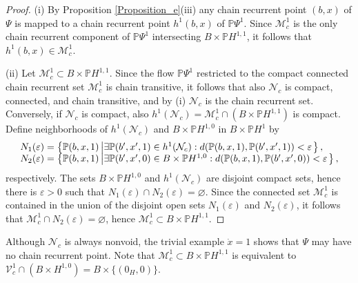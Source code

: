 	\begin{proof}
		(i) By Proposition \ref{Proposition_e}(iii) any chain recurrent point $(b,x)$
		of $\Psi$ is mapped to a chain recurrent point $h^{1}(b,x)$ of $\mathbb{P}%
		\Psi^{1}$. Since $\mathcal{M}_{c}^{1}$ is the only chain recurrent component
		of $\mathbb{P}\Psi^{1}$ intersecting $B\times\mathbb{P}H^{1,1}$, it follows
		that $h^{1}(b,x)\in\mathcal{M}_{c}^{1}$.
		
		(ii) Let $\mathcal{M}_{c}^{1}\subset B\times\mathbb{P}H^{1,1}$. Since the flow
		$\mathbb{P}\Psi^{1}$ restricted to the compact connected chain recurrent set
		$\mathcal{M}_{c}^{1}$ is chain transitive, it follows that also $\mathcal{N}%
		_{c}$ is compact, connected, and chain transitive, and by (i) $\mathcal{N}%
		_{c}$ is the chain recurrent set. Conversely, if $\mathcal{N}_{c}$ is compact,
		also $h^{1}(\mathcal{N}_{c})=\mathcal{M}_{c}^{1}\cap\left(  B\times
		\mathbb{P}H^{1,1}\right)  $ is compact. Define neighborhoods of $h^{1}%
		(\mathcal{N}_{c})$ and $B\times\mathbb{P}H^{1,0}$ in $B\times\mathbb{P}H^{1}$
		by
		\[%
		\begin{array}
			[c]{l}%
			N_{1}(\varepsilon)=\left\{  \mathbb{P}(b,x,1)\left\vert \exists\mathbb{P}%
			(b^{\prime},x^{\prime},1)\in h^{1}(\mathcal{N}_{c}):d(\mathbb{P}%
			(b,x,1),\mathbb{P}(b^{\prime},x^{\prime},1))<\varepsilon\right.  \right\}  ,\\
			N_{2}(\varepsilon)=\left\{  \mathbb{P}(b,x,1)\left\vert \exists\mathbb{P}%
			(b^{\prime},x^{\prime},0)\in B\times\mathbb{P}H^{1,0}:d(\mathbb{P}%
			(b,x,1),\mathbb{P}(b^{\prime},x^{\prime},0))<\varepsilon\right.  \right\}  ,
		\end{array}
		\]
		respectively. The sets $B\times\mathbb{P}H^{1,0}$ and $h^{1}(\mathcal{N}_{c})$
		are disjoint compact sets, hence there is $\varepsilon>0$ such that
		$N_{1}(\varepsilon)\cap N_{2}(\varepsilon)=\varnothing$. Since the connected
		set $\mathcal{M}_{c}^{1}$ is contained in the union of the disjoint open sets
		$N_{1}(\varepsilon)$ and $N_{2}(\varepsilon)$, it follows that $\mathcal{M}%
		_{c}^{1}\cap N_{2}(\varepsilon)=\varnothing$, hence $\mathcal{M}_{c}%
		^{1}\subset B\times\mathbb{P}H^{1,1}$.
	\end{proof}
	
	\begin{remark}
		Although $\mathcal{N}_{c}$ is always nonvoid, the trivial example $\dot{x}=1$
		shows that $\Psi$ may have no chain recurrent point. Note that $\mathcal{M}%
		_{c}^{1}\subset B\times\mathbb{P}H^{1,1}$ is equivalent to $\mathcal{V}%
		_{c}^{1}\cap(B\times H^{1,0})=B\times\{\left(  0_{H},0\right)  \}$.
	\end{remark}
	
